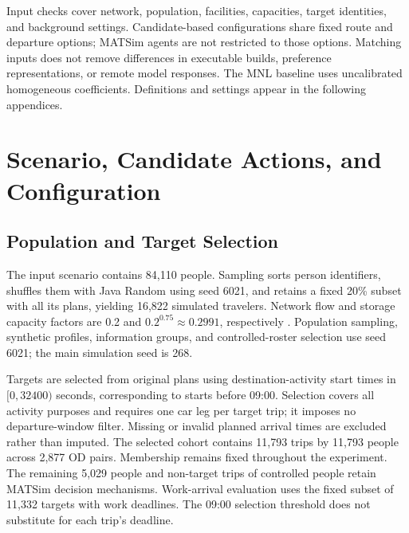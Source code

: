 Input checks cover network, population, facilities, capacities, target identities, and background settings. Candidate-based configurations share fixed route and departure options; MATSim agents are not restricted to those options. Matching inputs does not remove differences in executable builds, preference representations, or remote model responses. The MNL baseline uses uncalibrated homogeneous coefficients. Definitions and settings appear in the following appendices.
\FloatBarrier


\section{Scenario, Candidate Actions, and Configuration}
\label{app:configuration}

\subsection{Population and Target Selection}

The input scenario contains 84,110 people. Sampling sorts person identifiers, shuffles them with Java Random using seed 6021, and retains a fixed 20\% subset with all its plans, yielding 16,822 simulated travelers. Network flow and storage capacity factors are 0.2 and $0.2^{0.75}\approx0.2991$, respectively \cite{mersiniScalingMATSimTraffic2026,ben-dorPopulationDownscalingMultiagent2021}. Population sampling, synthetic profiles, information groups, and controlled-roster selection use seed 6021; the main simulation seed is 268.

Targets are selected from original plans using destination-activity start times in $[0,32400)$ seconds, corresponding to starts before 09:00. Selection covers all activity purposes and requires one car leg per target trip; it imposes no departure-window filter. Missing or invalid planned arrival times are excluded rather than imputed. The selected cohort contains 11,793 trips by 11,793 people across 2,877 OD pairs. Membership remains fixed throughout the experiment. The remaining 5,029 people and non-target trips of controlled people retain MATSim decision mechanisms. Work-arrival evaluation uses the fixed subset of 11,332 targets with work deadlines. The 09:00 selection threshold does not substitute for each trip's deadline.

